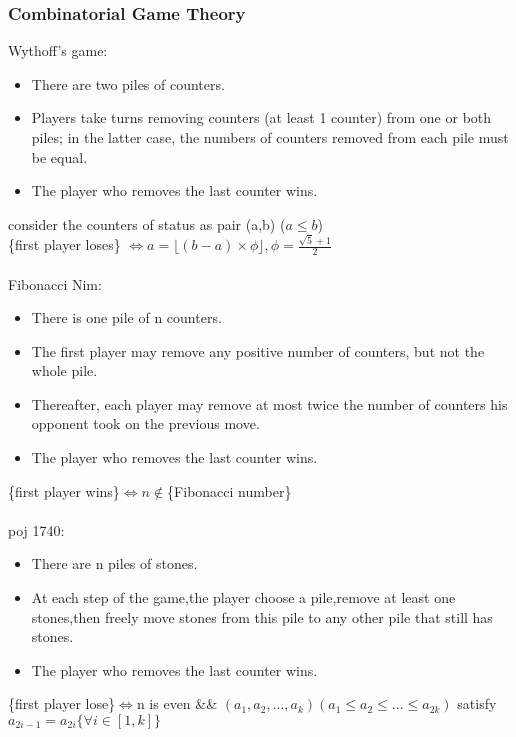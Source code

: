 \subsubsection{Combinatorial Game Theory}
Wythoff's game:
        \begin{itemize}
\item There are two piles of counters.
\item Players take turns removing counters (at least 1 counter) from one or both piles; in the latter case, the numbers of counters removed from each pile must be equal.
\item The player who removes the last counter wins. 
    \end{itemize}
consider the counters of status as pair (a,b) ($a\leq b$)\\
\{first player loses\} $\iff a=\lfloor (b-a)\times \phi \rfloor, \phi=\frac{\sqrt{5}+1}{2}$\\
    \\
Fibonacci Nim:
        \begin{itemize}
\item There is one pile of n counters.
\item The first player may remove any positive number of counters, but not the whole pile.
\item Thereafter, each player may remove at most twice the number of counters his opponent took on the previous move.
\item The player who removes the last counter wins.
    \end{itemize}
\{first player wins\}$\iff n \not\in$\{Fibonacci number\}\\
        \\
poj 1740:
    \begin{itemize}
\item There are n piles of stones.
\item At each step of the game,the player choose a pile,remove at least one stones,then freely move stones from this pile to any other pile that still has stones. 
\item The player who removes the last counter wins.
    \end{itemize}
    \{first player lose\}$\iff$n is even \&\& $(a_1,a_2,...,a_k)(a_1\leq a_2\leq ...\leq a_{2k})$ satisfy $a_{2i-1}=a_{2i}\{\forall i \in [1,k]\}$\\
\\

